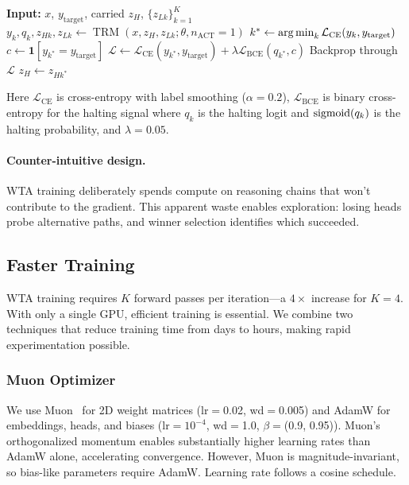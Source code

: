 \begin{algorithm}[h]
\caption{Oracle-First Training (one step)}
\label{alg:wta}
\begin{algorithmic}[1]
  \STATE \textbf{Input:} $x$, $y_\text{target}$, carried $z_H$, $\{z_{Lk}\}_{k=1}^K$
    \STATE $y_k, q_k, z_{Hk}, z_{Lk} \gets \operatorname{TRM}(x, z_H, z_{Lk}; \theta, n_\text{ACT}=1)$
  \ENDFOR
  \STATE $k^* \gets \argmin_{k} \mathcal{L}_\text{CE}(y_k, y_\text{target})$ 
  \STATE $c \gets \mathbf{1}[y_{k^*} = y_\text{target}]$ 
  \STATE $\mathcal{L} \gets \mathcal{L}_\text{CE}(y_{k^*}, y_\text{target}) + \lambda \mathcal{L}_\text{BCE}(q_{k^*}, c)$
  \STATE Backprop through $\mathcal{L}$
  \STATE $z_H \gets z_{Hk^*}$ 
\end{algorithmic}
\end{algorithm}
%
\noindent Here $\mathcal{L}_\text{CE}$ is cross-entropy with label smoothing
($\alpha{=}0.2$), $\mathcal{L}_\text{BCE}$ is binary cross-entropy for the
halting signal where $q_k$ is the halting logit and $\operatorname{sigmoid}(q_k)$ is the
halting probability, and $\lambda{=}0.05$.

\paragraph{Counter-intuitive design.} WTA training deliberately spends compute
on reasoning chains that won't contribute to the gradient. This apparent waste
enables exploration: losing heads probe alternative paths, and winner selection
identifies which succeeded.

\subsection{Faster Training}

WTA training requires $K$ forward passes per iteration---a $4\times$ increase
for $K{=}4$. With only a single GPU, efficient training is essential. We
combine two techniques that reduce training time from days to hours, making
rapid experimentation possible.

\subsubsection{Muon Optimizer}

We use Muon~\citep{jordan2024muon} for 2D weight matrices (lr${=}$0.02,
wd${=}$0.005) and AdamW for embeddings, heads, and biases (lr${=}10^{-4}$,
wd${=}$1.0, $\beta{=}$(0.9, 0.95)). Muon's orthogonalized momentum enables
substantially higher learning rates than AdamW alone, accelerating convergence.
However, Muon is magnitude-invariant, so bias-like parameters require AdamW.
Learning rate follows a cosine schedule.

